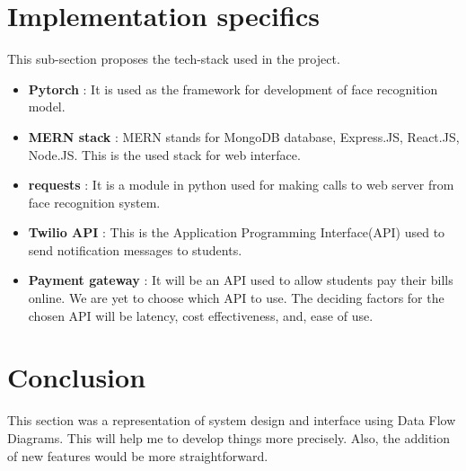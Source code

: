 \section{Implementation specifics}
This sub-section proposes the tech-stack used in the project.
	\begin{itemize}
		\item \textbf{Pytorch} : It is used as the framework for development of face recognition model.
		\item \textbf{MERN stack} : MERN stands for MongoDB database, Express.JS, React.JS, Node.JS.  This is the used stack for web interface.
		\item \textbf{requests} : It is a module in python used for making calls to web server from face recognition system.
		\item \textbf{Twilio API} : This is the Application Programming Interface(API) used to send notification messages to students.
		\item \textbf{Payment gateway} : It will be an API used to allow students pay their bills online. We are yet to choose which API to use. The deciding factors for the chosen API will be latency, cost effectiveness, and, ease of use.
	\end{itemize}
\section{Conclusion}
This section was a representation of system design and interface using Data Flow Diagrams. This will help me to develop things more precisely. Also, the addition of new features would be more straightforward.
